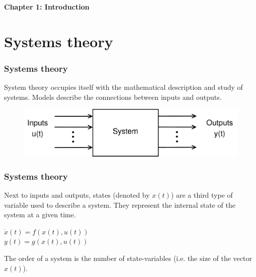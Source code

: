 \begin{frame}
	\frametitle{}
	 	\begin{center}
				\textbf{\huge{Chapter 1: Introduction}}
		\end{center}
	\end{frame}

\section{Systems theory} 

\begin{frame}
	\frametitle{Systems theory}
	System theory occupies itself with the mathematical description and study of systems.
	Models describe the connections between inputs and outputs.\\
	\bigskip
	\begin{figure}
		\includegraphics[width=.9\linewidth]{systems_theory}
	\end{figure}
	\bigskip
\end{frame}

\begin{frame}
	\frametitle{Systems theory}
	Next to inputs and outputs, states (denoted by $x(t)$) are a third type of variable used to describe a system. They represent the internal state of the system at a given time.\\
	\begin{center}
		$\dot{x}(t) = f(x(t),u(t))$\\
		$y(t) = g(x(t),u(t))$\\
	\end{center}
	The order of a system is the number of state-variables (i.e. the size of the vector $x(t)$).\\
	\bigskip
\end{frame}


